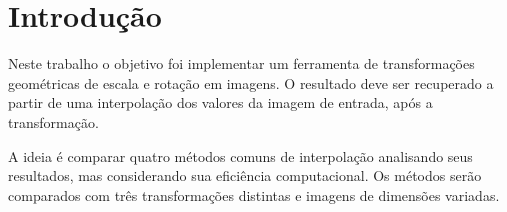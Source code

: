 \section{Introdução} \label{sec:introducao}

Neste trabalho o objetivo foi implementar um ferramenta de transformações geométricas de escala e rotação em imagens. O resultado deve ser recuperado a partir de uma interpolação dos valores da imagem de entrada, após a transformação.

A ideia é comparar quatro métodos comuns de interpolação analisando seus resultados, mas considerando sua eficiência computacional. Os métodos serão comparados com três transformações distintas e imagens de dimensões variadas.
